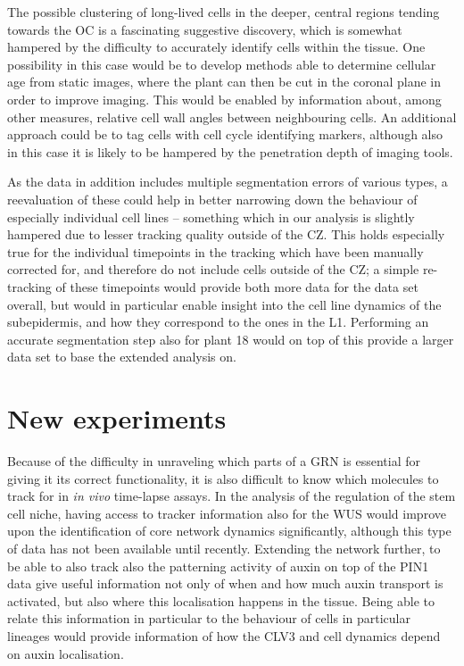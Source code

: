 The possible clustering of long-lived cells in the deeper, central regions
tending towards the OC is a fascinating suggestive discovery, which is somewhat
hampered by the difficulty to accurately identify cells within the tissue.
One possibility in this case would be to develop methods able to determine
cellular age from static images, where the plant can then be cut in the coronal
plane in order to improve imaging. This would be enabled by information about, among
other measures, relative cell wall angles between neighbouring cells. An
additional approach could be to tag cells with cell cycle identifying markers,
although also in this case it is likely to be hampered by the penetration depth
of imaging tools.

As the data in addition includes multiple segmentation errors of various types,
a reevaluation of these could help in better narrowing down the behaviour of
especially individual cell lines -- something which in our analysis is slightly
hampered due to lesser tracking quality outside of the CZ. This holds especially
true for the individual timepoints in the tracking which have been manually
corrected for, and therefore do not include cells outside of the CZ; a simple
re-tracking of these timepoints would provide both more data for the data set
overall, but would in particular enable insight into the cell line dynamics of
the subepidermis, and how they correspond to the ones in the L1. Performing an
accurate segmentation step also for plant 18 would on top of this provide a
larger data set to base the extended analysis on.


\section{New experiments}
Because of the difficulty in unraveling which parts of a GRN is essential for
giving it its correct functionality, it is also difficult to know which
molecules to track for in \textit{in vivo} time-lapse assays.
In the analysis of the regulation of the stem cell niche, having access to
tracker information also for the WUS would improve upon the identification of
core network dynamics significantly, although this type of data has not been
available until recently. Extending the network further, to be able to also
track also the patterning activity of auxin on top of the PIN1 data give useful
information not only of when and how much auxin transport is activated, but also
where this localisation happens in the tissue. Being able to relate this
information in particular to the behaviour of cells in particular lineages would
provide information of how the CLV3 and cell dynamics depend on auxin localisation.

